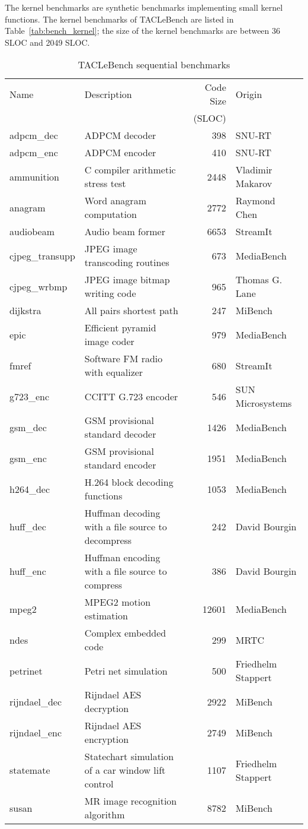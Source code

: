 \documentclass[a4paper,UKenglish]{oasics}
\begin{document}
The kernel benchmarks are synthetic benchmarks implementing small kernel functions.
The kernel benchmarks of TACLeBench are listed in Table~\ref{tab:bench_kernel}; the size of the kernel benchmarks are between 36 SLOC and 2049 SLOC.
%
\begin{table}
\centering
\caption{\label{tab:bench_sequential}TACLeBench sequential benchmarks}
\begin{tabular}{lL{5.5cm}rR{2.5cm}}
\toprule
Name & Description & Code Size & Origin\\
   & &  (SLOC) & \\ \midrule
adpcm\_dec & ADPCM decoder & 398 & SNU-RT \\
adpcm\_enc &  ADPCM encoder  & 410  & SNU-RT \\
ammunition & C compiler arithmetic stress test  & 2448 & Vladimir Makarov \\
anagram &  Word anagram computation & 2772  & Raymond Chen \\
audiobeam &  Audio beam former  & 6653  & StreamIt \\
cjpeg\_transupp &  JPEG image transcoding routines  & 673 & MediaBench \\
cjpeg\_wrbmp & JPEG image bitmap writing code & 965 & Thomas G. Lane \\
dijkstra & All pairs shortest path  & 247  & MiBench \\
epic & Efficient pyramid image coder  & 979  & MediaBench \\
fmref &  Software FM radio with equalizer & 680  & StreamIt \\
g723\_enc &  CCITT G.723 encoder  & 546  & SUN Microsystems \\
gsm\_dec & GSM provisional standard decoder & 1426 & MediaBench \\
gsm\_enc & GSM provisional standard encoder & 1951 & MediaBench \\
h264\_dec &  H.264 block decoding functions & 1053 & MediaBench \\
huff\_dec &  Huffman decoding with a file source to decompress  & 242  & David Bourgin \\
huff\_enc & Huffman encoding with a file source to compress  & 386  & David Bourgin \\
mpeg2 &  MPEG2 motion estimation  & 12601 & MediaBench \\
ndes & Complex embedded code  & 299  & MRTC \\
petrinet & Petri net simulation & 500  & Friedhelm Stappert \\
rijndael\_dec & Rijndael AES decryption  & 2922 & MiBench \\
rijndael\_enc & Rijndael AES encryption  & 2749 & MiBench \\
statemate &  Statechart simulation of a car window lift control & 1107 & Friedhelm Stappert \\
susan &  MR image recognition algorithm & 8782 & MiBench \\
\bottomrule
\end{tabular}
\end{table}
\end{document}
